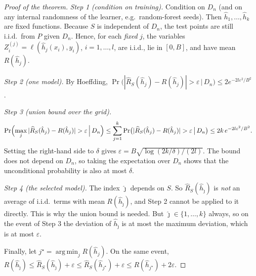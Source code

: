 \documentclass[11pt]{article}
\DeclareMathOperator*{\argmin}{arg\,min}
\begin{document}
\begin{proof}[Proof of the theorem]
\emph{Step 1 (condition on training).} Condition on $D_n$ (and on any internal randomness of the
learner, e.g.\ random-forest seeds). Then $\hat h_1,\dots,\hat h_k$ are fixed functions. Because
$S$ is independent of $D_n$, the test points are still i.i.d.\ from $P$ given $D_n$. Hence, for
each \emph{fixed} $j$, the variables $Z^{(j)}_i=\ell(\hat h_j(x_i),y_i)$, $i=1,\dots,l$, are
i.i.d., lie in $[0,B]$, and have mean $R(\hat h_j)$.

\emph{Step 2 (one model).} By Hoeffding,
$\Pr\bigl(|\widehat R_S(\hat h_j)-R(\hat h_j)|>\varepsilon\,\big|\,D_n\bigr)\le2e^{-2l\varepsilon^2/B^2}$.

\emph{Step 3 (union bound over the grid).}
\[
\Pr\Bigl(\max_j|\widehat R_S(\hat h_j)-R(\hat h_j)|>\varepsilon\,\Big|\,D_n\Bigr)
\le\sum_{j=1}^k\Pr\bigl(|\widehat R_S(\hat h_j)-R(\hat h_j)|>\varepsilon\,\big|\,D_n\bigr)
\le2k\,e^{-2l\varepsilon^2/B^2}.
\]
Setting the right-hand side to $\delta$ gives $\varepsilon=B\sqrt{\log(2k/\delta)/(2l)}$. The
bound does not depend on $D_n$, so taking the expectation over $D_n$ shows that the unconditional
probability is also at most $\delta$.

\emph{Step 4 (the selected model).} The index $\hat\jmath$ depends on $S$. So
$\widehat R_S(\hat h_{\hat\jmath})$ is \emph{not} an average of i.i.d.\ terms with mean
$R(\hat h_{\hat\jmath})$, and Step 2 cannot be applied to it directly. This is why the union bound
is needed. But $\hat\jmath\in\{1,\dots,k\}$ always, so on the event of Step 3 the deviation of
$\hat h_{\hat\jmath}$ is at most the maximum deviation, which is at most $\varepsilon$.

Finally, let $j^\star=\argmin_jR(\hat h_j)$. On the same event,
$R(\hat h_{\hat\jmath})\le\widehat R_S(\hat h_{\hat\jmath})+\varepsilon
\le\widehat R_S(\hat h_{j^\star})+\varepsilon\le R(\hat h_{j^\star})+2\varepsilon$.
\end{proof}
\end{document}
